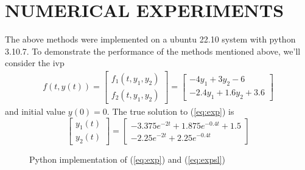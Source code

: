 \documentclass[12pt,oneside]{book}
\begin{document}
	\chapter{NUMERICAL EXPERIMENTS}
		The above methods were implemented on a ubuntu 22.10 system with python 3.10.7. \newline
		To demonstrate the performance of the methods mentioned above, we'll consider the \ac{ivp} 
		\begin{equation} \label{eq:exp}
			\begin{split}
				f(t, y(t)) = \begin{bmatrix}
					f_{1}(t, y_{1}, y_{2}) \\
					f_{2}(t, y_{1}, y_{2})
				\end{bmatrix} = \begin{bmatrix}
				-4y_{1} + 3y_{2} - 6 \\
				-2.4y_{1} + 1.6y_{2} + 3.6
			\end{bmatrix}
			\end{split}
		\end{equation}
		and initial value $ y(0) = 0 $. \newline
		The true solution to (\ref{eq:exp}) is 
		\begin{equation} \label{eq:expsl}
			\begin{bmatrix}
				y_{1}(t) \\
				y_{2}(t)
			\end{bmatrix} = \begin{bmatrix}
			-3.375e^{-2t} + 1.875e^{-0.4t} + 1.5 \\
			-2.25e^{-2t} + 2.25e^{-0.4t}
		\end{bmatrix}
		\end{equation}
		\begin{figure}[h!]
			\caption{Python implementation of (\ref{eq:exp}) and (\ref{eq:expsl})}
			
		\end{figure}
	
\end{document}
